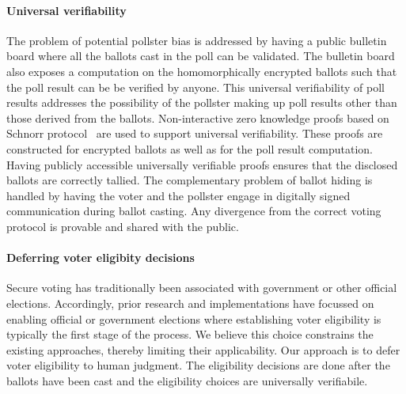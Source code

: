\paragraph{Universal verifiability}
The problem of potential pollster bias is addressed by having
a public bulletin board where all the ballots cast in the poll
can be validated. The bulletin board also exposes a computation
on the homomorphically encrypted ballots such that the
poll result can be be verified by anyone.  This universal
verifiability of poll results addresses the possibility of the pollster
making up poll results other than those derived from the ballots.
Non-interactive zero knowledge proofs based on Schnorr
protocol~\cite{Cramer:1994:PPK:646759.705842}
are used to support universal verifiability.  These proofs
are constructed for encrypted ballots as well as for
the poll result computation. 
Having publicly accessible universally verifiable proofs ensures
that the disclosed ballots are correctly tallied.
The complementary problem of ballot hiding is handled by
having the voter and the pollster engage in digitally signed communication
during ballot casting.  Any divergence from the correct voting
protocol is provable and shared with the public.


\paragraph{Deferring voter eligibity decisions}
Secure voting has traditionally been associated with government
or other official elections.  Accordingly, prior research and implementations
have focussed on enabling official or government elections where
establishing voter eligibility is typically the first stage of the
process.  We believe this choice constrains the existing approaches, thereby
limiting their applicability.  Our approach is
to defer voter eligibility to human judgment.  The eligibility decisions are done after
the ballots have been cast and the eligibility choices are universally verifiabile.



